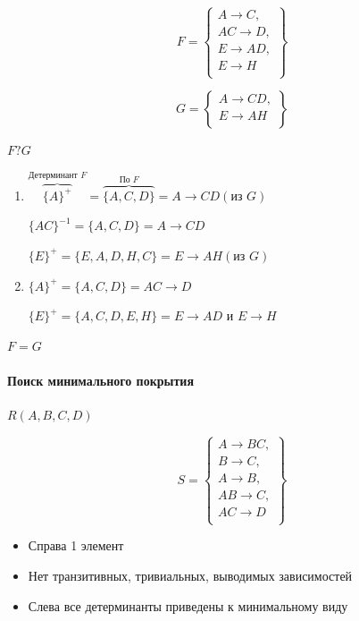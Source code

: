\documentclass[a4paper, 14pt]{report}
\begin{document}
\paragraph{}

$$
F =
\left\{
    \begin{matrix}
        A \to C,  \\
        AC \to D, \\
        E \to AD, \\
        E \to H   \\
    \end{matrix}
\right\}
$$

$$
G =
\left\{
    \begin{matrix}
        A \to CD, \\
        E \to AH  \\
    \end{matrix}
\right\}
$$

$F?G$

\begin{enumerate}
    \item $\overbrace{\{A\}^+}^{\text{Детерминант } F} = \overbrace{\{A,C,D\}}^{\text{По } F} = A \to CD (\text{из } G)$

        $\{AC\}^{-1} = \{A,C,D\} = A \to CD$

        $\{E\}^+ = \{E,A,D,H,C\} = E \to AH (\text{из } G)$

    \item $\{A\}^+ = \{A,C,D\} = AC \to D$

        $\{E\}^+ = \{A,C,D,E,H\} = E \to AD \text{ и } E \to H$
\end{enumerate}

$F = G$

\paragraph{Поиск минимального покрытия}

$R(A,B,C,D)$

$$
S =
\left\{
    \begin{matrix}
        A \to BC, \\
        B \to C,  \\
        A \to B,  \\
        AB \to C, \\
        AC \to D  \\
    \end{matrix}
\right\}
$$

\begin{itemize}
    \item Справа 1 элемент
    \item Нет транзитивных, тривиальных, выводимых зависимостей
    \item Слева все детерминанты приведены к минимальному виду
\end{itemize}
\end{document}
